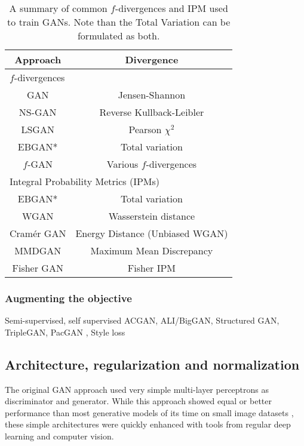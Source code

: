 \begin{table}
	\centering
	\begin{tabular}{|c c|}
		\hline
		Approach & Divergence \\
		\hline 
		\hline 
		\multicolumn{2}{|l|}{$f$-divergences} \\
		\hline
		GAN \citep{Goodfellow2014}& Jensen-Shannon \\
		NS-GAN \citep{Goodfellow2014} & Reverse Kullback-Leibler \\
		LSGAN \citep{Mao2017}& Pearson $\chi^2$ \\
		EBGAN* \citep{Zhao2017} & Total variation \\
		$f$-GAN \citep{Nowozin2016} & Various $f$-divergences\\
		\hline 
		\hline 
		\multicolumn{2}{|l|}{Integral Probability Metrics (\ac{IPM}s)}\\
		\hline
		EBGAN* \citep{Zhao2017} & Total variation \\
		WGAN \citep{Arjovsky2017}& Wasserstein distance \\
		Cramér GAN \citep{Bellemare2017}& Energy Distance (Unbiased WGAN) \\
		MMDGAN \citep{Li2017a}& Maximum Mean Discrepancy \\				
		Fisher GAN\citep{Mroueh2017}& Fisher IPM \\
		\hline
	\end{tabular}
	\label{table:divergences}
	\caption[Summary of common $f$-divergences and \ac{IPM} used to train GANs]{A summary of common $f$-divergences and \ac{IPM} used to train GANs. Note than the Total Variation can be formulated as both.}
\end{table}


\subsubsection{Augmenting the objective}
\label{subs:augmented_objectives}

Semi-supervised, self supervised
ACGAN, ALI/BigGAN, Structured GAN, TripleGAN,  PacGAN , Style loss



\subsection{Architecture, regularization and normalization}

The original GAN approach \citep{Goodfellow2014} used very simple multi-layer perceptrons as discriminator and generator. While this approach showed equal or better performance than most generative models of its time \citep{Kingma2014b,Bengio2014} on small image datasets \citep{LeCun1998a, Krizhevsky2009}, these simple architectures were quickly enhanced with tools from regular deep learning and computer vision.

